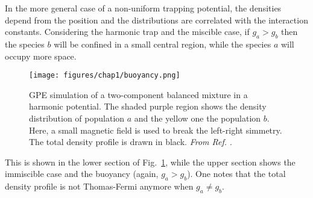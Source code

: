 In the more general case of a non-uniform trapping potential, the densities depend from the position and the distributions are correlated with the interaction constants. Considering the harmonic trap and the miscible case, if $g_a > g_b$ then the species $b$ will be confined in a small central region, while the species $a$ will occupy more space.
\begin{figure}[ht!]
    \centering
    \texttt{[image: figures/chap1/buoyancy.png]}
    \caption{GPE simulation of a two-component balanced mixture in a harmonic potential. The shaded purple region shows the density distribution of population $a$ and the yellow one the population $b$. Here, a small magnetic field is used to break the left-right simmetry. The total density profile is drawn in black. \textit{From Ref. \cite{lamporesi2023two}}.} 
    \label{fig:buoy}
\end{figure}
This is shown in the lower section of Fig.\ \ref{fig:buoy}, while the upper section shows the immiscible case and the buoyancy (again, $g_a > g_b$). One notes that the total density profile is not Thomas-Fermi anymore when $g_a \neq g_b$.


